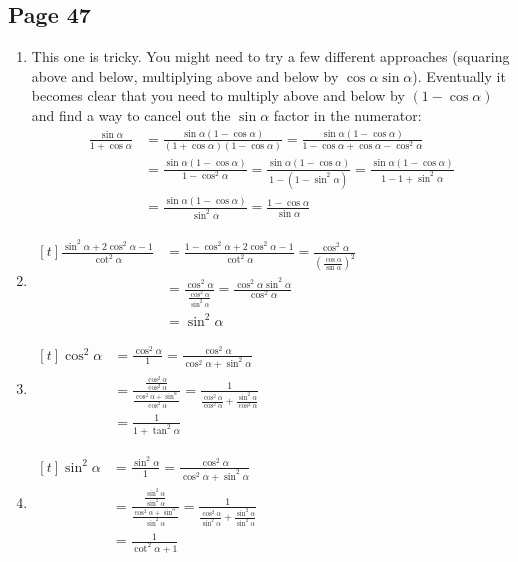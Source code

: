 \documentclass{article}
\newenvironment{solutions}[1]
{\subsection*{#1}
 \begin{enumerate}[leftmargin=1.5em]}
{\end{enumerate}}
\newenvironment{subsolutions}
{\begin{enumerate}}
{\end{enumerate}}
\newcommand{\subsolution}{\item}
\begin{document}
\begin{solutions}{Page 47}
\begin{subsolutions}
\subsolution %
This one is tricky. You might need to try a few different approaches (squaring above and below, multiplying above and below by $\cos{\alpha}\sin{\alpha}$). Eventually it becomes clear that you need to multiply above and below by $(1 - \cos{\alpha})$ and find a way to cancel out the $\sin{\alpha}$ factor in the numerator:
\begin{align*}
\frac{\sin{\alpha}}{1 + \cos{\alpha}} &= \frac{\sin{\alpha}(1 - \cos{\alpha})}{(1 + \cos{\alpha})(1 - \cos{\alpha})} = \frac{\sin{\alpha}(1 - \cos{\alpha})}{1 - \cos{\alpha} + \cos{\alpha} - \cos^{2}{\alpha}} \\
&= \frac{\sin{\alpha}(1 - \cos{\alpha})}{1 - \cos^{2}{\alpha}} = \frac{\sin{\alpha}(1 - \cos{\alpha})}{1 - (1 - \sin^{2}{\alpha})} = \frac{\sin{\alpha}(1 - \cos{\alpha})}{1 - 1 + \sin^{2}{\alpha}} \\
&= \frac{\sin{\alpha}(1 - \cos{\alpha})}{\sin^{2}{\alpha}} = \frac{1 - \cos{\alpha}}{\sin{\alpha}}
\end{align*}

\subsolution %
$\begin{aligned}[t]
\frac{\sin^{2}{\alpha} + 2\cos^{2}{\alpha} - 1}{\cot^{2}{\alpha}} &=  \frac{1 - \cos^{2}{\alpha} + 2\cos^{2}{\alpha} - 1}{\cot^{2}{\alpha}} = \frac{\cos^{2}{\alpha}}{\left(\frac{\cos{\alpha}}{\sin{\alpha}}\right)^2} \\
&=  \frac{\cos^{2}{\alpha}}{\frac{\cos^{2}{\alpha}}{\sin^{2}{\alpha}}} = \frac{\cos^{2}{\alpha}\sin^{2}{\alpha}}{\cos^{2}{\alpha}} \\
&= \sin^{2}{\alpha}
\end{aligned}$

\subsolution %
$\begin{aligned}[t]
\cos^{2}{\alpha} &= \frac{\cos^{2}{\alpha}}{1} = \frac{\cos^{2}{\alpha}}{\cos^{2}{\alpha} + \sin^{2}{\alpha}} \\
&=  \frac{\frac{\cos^{2}{\alpha}}{\cos^{2}{\alpha}}}{\frac{\cos^{2}{\alpha} + \sin^{\alpha}}{\cos^{2}{\alpha}}} = \frac{1}{\frac{\cos^{2}{\alpha}}{\cos^{2}{\alpha}} + \frac{\sin^{2}{\alpha}}{\cos^{2}{\alpha}}} \\
&= \frac{1}{1 + \tan^{2}{\alpha}}
\end{aligned}$


\subsolution %
$\begin{aligned}[t]
\sin^{2}{\alpha} &= \frac{\sin^{2}{\alpha}}{1} = \frac{\cos^{2}{\alpha}}{\cos^{2}{\alpha} + \sin^{2}{\alpha}} \\
&=  \frac{\frac{\sin^{2}{\alpha}}{\sin^{2}{\alpha}}}{\frac{\cos^{2}{\alpha} + \sin^{\alpha}}{\sin^{2}{\alpha}}} = \frac{1}{\frac{\cos^{2}{\alpha}}{\sin^{2}{\alpha}} + \frac{\sin^{2}{\alpha}}{\sin^{2}{\alpha}}} \\
&= \frac{1}{\cot^{2}{\alpha} + 1}
\end{aligned}$


\end{subsolutions}
\end{solutions}
\end{document}
